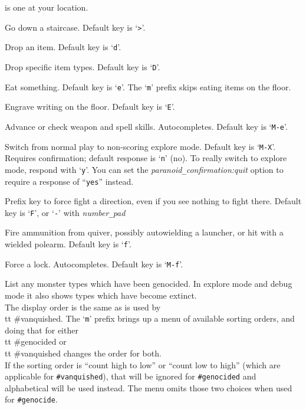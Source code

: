 is one at your location.
\item[\tb{\#down}]
Go down a staircase. Default key is `{\tt >}'.
\item[\tb{\#drop}]
Drop an item. Default key is `{\tt d}'.
\item[\tb{\#droptype}]
Drop specific item types. Default key is `{\tt D}'.
\item[\tb{\#eat}]
Eat something. Default key is `{\tt e}'.
The `{\tt m}' prefix skips eating items on the floor.
\item[\tb{\#engrave}]
Engrave writing on the floor. Default key is `{\tt E}'.
\item[\tb{\#enhance}]
Advance or check weapon and spell skills. Autocompletes.
Default key is `{\tt M-e}'.
\item[\tb{\#exploremode}]
Switch from normal play to non-scoring explore mode.
Default key is `{\tt M-X}'.\\
Requires confirmation; default response is `{\tt n}' (no).
To really switch to explore mode, respond with `{\tt y}'.
You can set the
{\it paranoid\verb+_+confirmation:quit\/}
option to require a response of ``{\tt yes}'' instead.
\item[\tb{\#fight}]
Prefix key to force fight a direction, even if you see nothing
to fight there.
Default key is `{\tt F}', or `{\tt -}' with
{\it number\verb+_+pad\/}
\item[\tb{\#fire}]
Fire ammunition from quiver, possibly autowielding a launcher,
or hit with a wielded polearm.
Default key is `{\tt f}'.
\item[\tb{\#force}]
Force a lock. Autocompletes. Default key is `{\tt M-f}'.
\item[\tb{\#genocided}]
List any monster types which have been genocided.
In explore mode and debug mode it also shows types which have become
extinct.
\\
The display order is the same as is used by {\\tt \#vanquished}.
The `{\tt m}' prefix brings up a menu of available sorting orders, and
doing that for either {\\tt \#genocided} or {\\tt \#vanquished} changes the order for both.
\\
If the sorting order is ``count high to low'' or ``count low to high''
(which are applicable for {\tt \#vanquished}), that will be ignored
for {\tt \#genocided} and alphabetical will be used instead.
The menu omits those two choices when used for {\tt \#genocide}.
